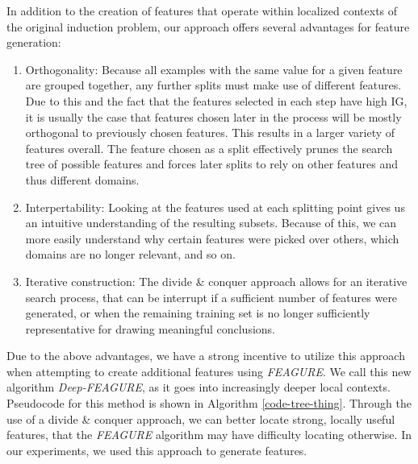 \documentclass[twoside,11pt]{article}
\theoremstyle{definition}
\begin{document}
In addition to the creation of features that operate within localized contexts of the original induction problem, our approach offers several advantages for feature generation:
\begin{enumerate}
	\item Orthogonality: Because all examples with the same value for a given feature are grouped together, any further splits must make use of different features. Due to this and the fact that the features selected in each step have high IG, it is usually the case that features chosen later in the process will be mostly orthogonal to previously chosen features. This results in a larger variety of features overall. The feature chosen as a split effectively prunes the search tree of possible features and forces later splits to rely on other features and thus different domains.
	\item Interpertability: Looking at the features used at each splitting point gives us an intuitive understanding of the resulting subsets. Because of this, we can more easily understand why certain features were picked over others, which domains are no longer relevant, and so on.
	\item Iterative construction: The divide \& conquer approach allows for an iterative search process, that can be interrupt if a sufficient number of features were generated, or when the remaining training set is no longer sufficiently representative for drawing meaningful conclusions.
\end{enumerate}

Due to the above advantages, we have a strong incentive to utilize this approach when attempting to create additional features using \emph{FEAGURE}. 
We call this new algorithm \emph{Deep-FEAGURE}, as it goes into increasingly deeper local contexts. 
Pseudocode for this method is shown in Algorithm \ref{code-tree-thing}.
Through the use of a divide \& conquer approach, we can better locate strong, locally useful features, that the \emph{FEAGURE} algorithm may have difficulty locating otherwise. In our experiments, we used this approach to generate features.
\end{document}
